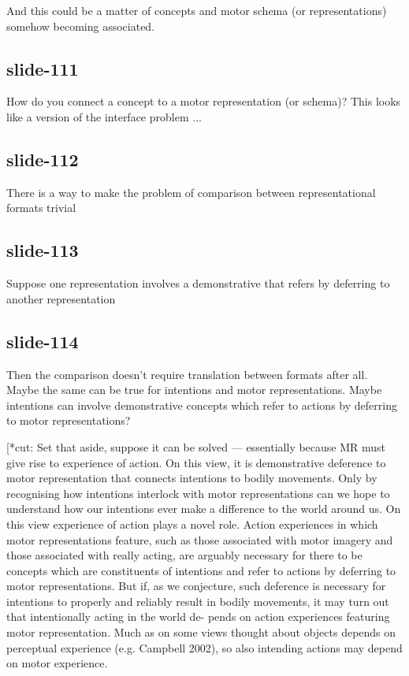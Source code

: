 \documentclass[12pt,\papersize]{extarticle}
\begin{document}
And this could be a matter of concepts and motor schema (or representations) somehow
becoming associated.


\subsection{slide-111}
How do you connect a concept to a motor representation (or schema)?
This looks like a version of the interface problem ...

\subsection{slide-112}
There is a way to make the problem of comparison between representational formats trivial

\subsection{slide-113}
Suppose one representation involves a demonstrative that refers by
deferring to another representation

\subsection{slide-114}
Then the comparison doesn’t require translation between formats after all.
Maybe the same can be true for intentions and motor representations.
Maybe intentions can involve demonstrative concepts which refer to actions by deferring to motor representations?

[*cut:
Set that aside, suppose it can be solved --- essentially because MR must give rise to
experience of action.
On this view, it is demonstrative deference to motor representation that connects
intentions to bodily movements.
Only by recognising how intentions interlock with motor representations can we hope to
understand how our intentions ever make a difference to the world around us.
On this view experience of action plays a novel role.
Action experiences in which motor representations feature, such as those associated with
motor imagery and those associated with really acting, are arguably necessary for there to
be concepts which are constituents of intentions and refer to actions by deferring to
motor representations.
But if, as we conjecture, such deference is necessary for intentions to properly and
reliably result in bodily movements, it may turn out that intentionally acting in the
world de- pends on action experiences featuring motor representation.
Much as on some views thought about objects depends on perceptual experience (e.g.
Campbell 2002), so also intending actions may depend on motor experience.
\end{document}
